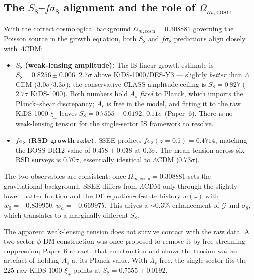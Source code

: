 \documentclass[12pt,a4paper]{article}
\begin{document}
\subsection{The $S_8$--$f\sigma_8$ alignment and the role of $\Omega_{m,\mathrm{cosm}}$}
\label{subsec:S8_fsigma8_split}

With the correct cosmological background $\Omega_{m,\mathrm{cosm}} = 0.308881$
governing the Poisson source in the growth equation, both $S_8$ and
$f\sigma_8$ predictions align closely with $\Lambda$CDM:

\begin{itemize}
  \item \textbf{$S_8$ (weak-lensing amplitude):}
        The IS linear-growth estimate is $S_8 = 0.8256 \pm 0.006$, $2.7\sigma$
        above KiDS-1000/DES-Y3 --- slightly \emph{better} than $\Lambda$CDM
        ($3.0\sigma$/$3.3\sigma$); the conservative CLASS amplitude ceiling is
        $S_8 = 0.827$ ($2.7\sigma$ KiDS-1000).
        Both numbers hold $A_s$ \emph{fixed} to Planck, which imports the
        Planck--shear discrepancy; $A_s$ is free in the model, and fitting it
        to the raw KiDS-1000 $\xi_\pm$ leaves $S_8 = 0.7555\pm0.0192$,
        $0.11\sigma$ (Paper~6). There is no weak-lensing tension for the
        single-sector IS framework to resolve.

  \item \textbf{$f\sigma_8$ (RSD growth rate):}
        SSEE predicts $f\sigma_8(z=0.5) = 0.4714$, matching the
        BOSS DR12 value of $0.458 \pm 0.038$ at $0.3\sigma$.
        The mean tension across six RSD surveys is $0.70\sigma$, essentially
        identical to $\Lambda$CDM ($0.73\sigma$).
\end{itemize}

The two observables are consistent: once $\Omega_{m,\mathrm{cosm}}=0.308881$
sets the gravitational background, SSEE differs from $\Lambda$CDM only
through the slightly lower matter fraction and the DE equation-of-state history
$w(z)$ with $w_0=-0.839950$, $w_a=-0.669975$.
This drives a $\sim$0.3\% enhancement of $\mathcal{G}$ and $\sigma_8$, which
translates to a marginally different $S_8$.

The apparent weak-lensing tension does not survive contact with the raw data.
A two-sector $\phi$-DM construction was once proposed to remove it by
free-streaming suppression; Paper~6 retracts that construction and shows the
tension was an artefact of holding $A_s$ at its Planck value. With $A_s$ free,
the single sector fits the 225 raw KiDS-1000 $\xi_\pm$ points at
$S_8 = 0.7555\pm0.0192$.
\end{document}
